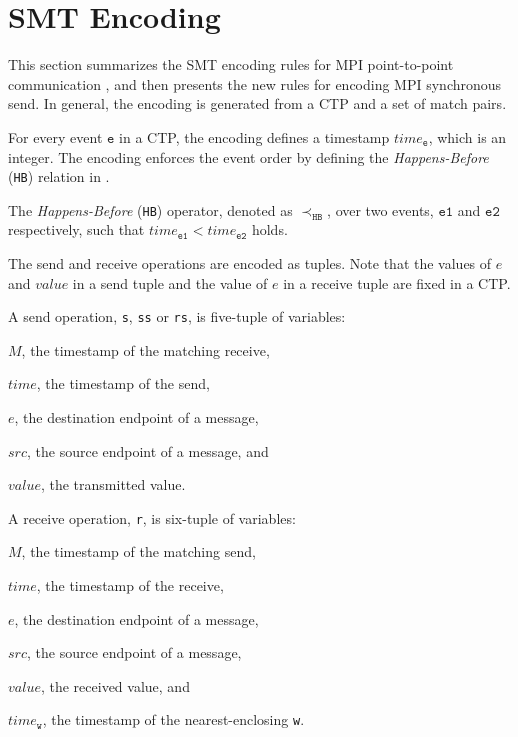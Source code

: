 \section{SMT Encoding}
This section summarizes the SMT encoding rules for MPI point-to-point communication \cite{}, and then presents the new rules for encoding MPI synchronous send. In general, the encoding is generated from a CTP and a set of match pairs.

For every event $\mathtt{e}$ in a CTP, the encoding defines a timestamp $\mathit{time}_\mathtt{e}$, which is an integer. The encoding enforces the event order by defining the \textit{Happens-Before} (\texttt{HB}) relation in .

\begin{definition}
The \textit{Happens-Before} (\texttt{HB}) operator, denoted as $\prec_\mathtt{HB}$, over two events, $\mathtt{e1}$ and $\mathtt{e2}$ respectively, such that $\mathit{time}_\mathtt{e1}<\mathit{time}_\mathtt{e2}$ holds.
\label{def:hb}
\end{definition}

The send and receive operations are encoded as tuples. Note that the values of $e$ and $\mathit{value}$ in a send tuple and the value of $e$ in a receive tuple are fixed in a CTP. 

\begin{definition}
A send operation, \texttt{s}, \texttt{ss} or \texttt{rs}, is five-tuple of variables:
\begin{compactenum}
\item $M$, the timestamp of the matching receive,
\item $\mathit{time}$, the timestamp of the send,
\item $e$, the destination endpoint of a message,
\item $\mathit{src}$, the source endpoint of a message, and
\item $\mathit{value}$, the transmitted value.
\end{compactenum}
\end{definition}

\begin{definition}
A receive operation, \texttt{r}, is six-tuple of variables:
\begin{compactenum}
\item $M$, the timestamp of the matching send,
\item $\mathit{time}$, the timestamp of the receive,
\item $e$, the destination endpoint of a message,
\item $\mathit{src}$, the source endpoint of a message, 
\item $\mathit{value}$, the received value, and
\item $\mathit{time}_\mathtt{w}$, the timestamp of the nearest-enclosing \texttt{w}.
\end{compactenum}
\label{def:receive}
\end{definition}

